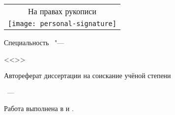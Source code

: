 
\thispagestyle{empty}


\noindent%
\begin{flushright}
	\begin{tabular}{@{}c@{}}
		\large
		На правах рукописи \\
		\texttt{[image: personal-signature]}
	\end{tabular}
\end{flushright}


\vspace{0pt plus2fill}
\begin{center}
	\Large \thesisAuthor
\end{center}


\vspace{0pt plus1fill}
\begin{center}
	\textbf {\large \MakeUppercase \thesisTitle}
	
	\vspace{0pt plus1fill} 
	{\large Специальность \thesisSpecialtyNumber\ "---\par <<\thesisSpecialtyTitle>>}
	
	\vspace{0pt plus1fill} %
	\large{Автореферат диссертации на соискание учёной степени\par \thesisDegree}
\end{center}


\vspace{0pt plus4fill} 
{\large \centering\thesisCity~---~\thesisYear\par}


\newpage
\thispagestyle{empty}


\noindent%
Работа выполнена в {\thesisInFirstOrganization} и {\thesisInSecondOrganization}.


